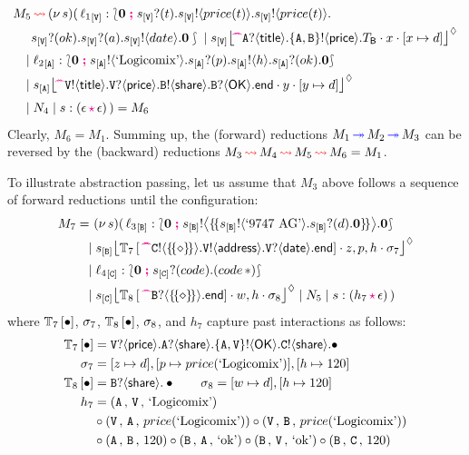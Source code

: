 \documentclass[runningheads,plain]{llncs}
\begin{document}
\begin{align*}
M_5 & \bk  \news{s}(\,  
\np{\key{{\loc_1}}{\pS}}{ \conf{\inact}{\binp{\epS}{t}\bout{\epS}{price(t)}\bout{\epS}{price(t)} \\ 
&   \binp{\epS}{ok}\binp{\epS}{a} \bout{\epS}{date}\inact }} 
 \Par 
 \hmoni{\ep{s}{\pS}}{\!\!\past \ltinp{A}{\mathsf{title}}{\ltout{\{A,B\}}{\mathsf{price}}{T_\mathsf{B}}}}{x}{\upd{x}{d}} 
\\
& \!\!\!\! \Par \np{\key{{\loc_2}}{\pA}}{ \conf{\inact}{\bout{\epA}{\exBook}\binp{\epA}{p}\bout{\epA}{h}\binp{\epA}{ok}\inact}} 
\\
& \!\!\!\!\Par 
\hmoni{\ep{s}{\pA}}{\!\!\past \ltout{\pS}{\mathsf{title}}{\ltinp{\pS}{\mathsf{price}}{\ltout{B}{\mathsf{share}}{\ltinp{B}{\mathsf{OK}}{\lend}}}}}{y}{\upd{y}{d}} 
\\
& \!\!\!\! 
\Par N_4 \Par \codah{s}{\emp}{\emp}{}~)  = M_6
\end{align*}
Clearly, $M_6 = M_1$.
Summing up, the (forward) reductions
$M_1 \textcolor{blue}{\,\twoheadrightarrow\,} M_2 \textcolor{blue}{\,\twoheadrightarrow\,} M_3$ can be reversed by the (backward) reductions
$M_3 \textcolor{red}{\,\rightsquigarrow\,} M_4 \textcolor{red}{\,\rightsquigarrow\,} M_5 \textcolor{red}{\,\rightsquigarrow\,} M_6 = M_1$.

To illustrate abstraction passing, let us assume that 
$M_3$ above follows a sequence of forward reductions
until the configuration:
\begin{align*}
M_7 = ~ &   \news{s}(\,  \np{\key{{\loc_3}}{\pB}}{ \conf{\inact}{\bbout{\epB}{\thunkp{\bout{\epB}{\text{`9747 AG'}}\binp{\epB}{d}\inact}}\inact}} 
\\
& \!\!\!\! \Par \hmoni{\ep{s}{\pB}}{\myctxr{\ctx{T}_7}{\past \ltout{C}{\thunkt}{\ltout{\pS}{\mathsf{address}}{\ltinp{\pS}{\mathsf{date}}{\lend}}}}}{z,p,h}{\store_7} 
\\
& \!\!\!\! \Par \np{\key{{\loc_4}}{\pC}}{ \conf{\inact}{\binp{\epC}{code}(\appl{code}{\dummyn})}} 
\\
&  \!\!\!\! \Par 
\hmoni{\ep{s}{\pC}}{\myctxr{\ctx{T}_8}{\past \ltinp{B}{\thunkt}{\lend}}}{w,h}{\store_8} 
\Par N_5 \Par \codah{s}{h_7}{\emp}{}~) 
\end{align*}
where 
${\mathbb{T}_7\left[\textcolor{black}{\bullet}\right]}$, $\sigma_7$, ${\mathbb{T}_8\left[\textcolor{black}{\bullet}\right]}$, $\sigma_8$,
and $h_7$ capture past interactions as follows:
\begin{align*}
{\mathbb{T}_7\left[\textcolor{black}{\bullet}\right]} & =
\mathtt{\mathtt{V}}?\langle\mathsf{price}\rangle.\mathtt{A}?\langle\mathsf{share}\rangle.\mathtt{\{A,\mathtt{V}\}}!\langle\mathsf{OK}\rangle.
\mathtt{C}!\langle\mathsf{share}\rangle.\bullet
\\
\sigma_7 & = [z\mapsto d],[p\mapsto price(\text{`Logicomix'})],[h\mapsto 120]
\\
{\mathbb{T}_8\left[\textcolor{black}{\bullet}\right]} & =\mathtt{B}?\langle\mathsf{share}\rangle.\bullet \qquad \sigma_8  = [w\mapsto d],[h\mapsto 120]
\\
h_7 & = 
(\mathtt{A} \,,\, \mathtt{V} \,,\,\text{`Logicomix'})
\\
& \circ
(\mathtt{V} \,,\, \mathtt{A} \,,\,price(\text{`Logicomix'}))
\circ
(\mathtt{V} \,,\, \mathtt{B} \,,\,price(\text{`Logicomix'}))
\\
& \circ
(\mathtt{A} \,,\, \mathtt{B} \,,\,120)
\circ
(\mathtt{B} \,,\, \mathtt{A} \,,\,\text{`ok'})
\circ
(\mathtt{B} \,,\, \mathtt{V} \,,\,\text{`ok'})
\circ
(\mathtt{B} \,,\, \mathtt{C} \,,\,120)
\end{align*}
\end{document}
